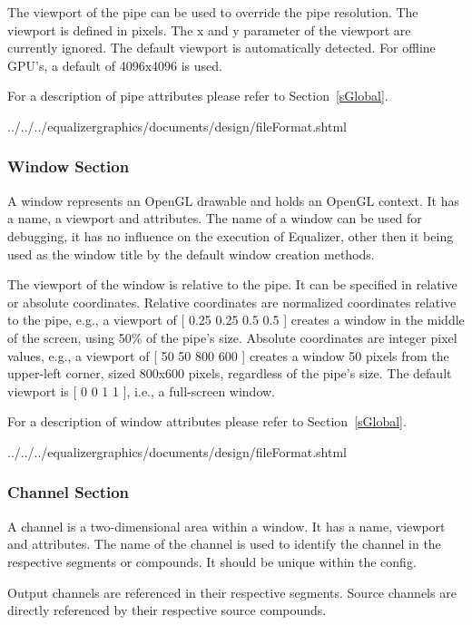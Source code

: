 \documentclass[10pt,a4]{scrartcl}
\newcommand{\sref}[1]{Section~\ref{#1}}
\begin{document}
The viewport of the pipe can be used to override the pipe
resolution. The viewport is defined in pixels. The x and y parameter of
the viewport are currently ignored. The default viewport is
automatically detected. For offline GPU's, a default of 4096x4096 is
used.

For a description of pipe attributes please refer to \sref{sGlobal}.

{\footnotesize
  {../../../equalizergraphics/documents/design/fileFormat.shtml}}

\subsubsection{Window Section}

A window represents an OpenGL drawable and holds an OpenGL context. It
has a name, a viewport and attributes. The name of a window can be used
for debugging, it has no influence on the execution of Equalizer, other
then it being used as the window title by the default window creation
methods.

The viewport of the window is relative to the pipe. It can be specified in
relative or absolute coordinates. Relative coordinates are normalized
coordinates relative to the pipe, e.g., a viewport of \textsf{[ 0.25 0.25 0.5
    0.5 ]} creates a window in the middle of the screen, using 50\% of the
pipe's size. Absolute coordinates are integer pixel values, e.g., a viewport of
\textsf{[ 50 50 800 600 ]} creates a window 50 pixels from the upper-left
corner, sized 800x600 pixels, regardless of the pipe's size. The default
viewport is \textsf{[ 0 0 1 1 ]}, i.e., a full-screen window.

For a description of window attributes please refer to \sref{sGlobal}.

{\footnotesize
  {../../../equalizergraphics/documents/design/fileFormat.shtml}}

\subsubsection{Channel Section}

A channel is a two-dimensional area within a window. It has a name,
viewport and attributes. The name of the channel is used to identify the
channel in the respective segments or compounds. It should be unique
within the config.

Output channels are referenced in their respective segments. Source channels are
directly referenced by their respective source compounds.
\end{document}
